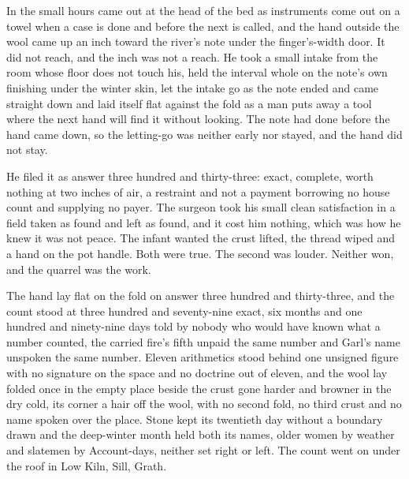 In the small hours  came out at the head of the bed as instruments come out on a towel when a case is done and before the next is called, and the hand outside the wool came up an inch toward the river's note under the finger's-width door. It did not reach, and the inch was not a reach. He took a small intake from the room whose floor does not touch his, held the interval whole on the note's own finishing under the winter skin, let the intake go as the note ended and came straight down and laid itself flat against the fold as a man puts away a tool where the next hand will find it without looking. The note had done before the hand came down, so the letting-go was neither early nor stayed, and the hand did not stay.

He filed it as answer three hundred and thirty-three: exact, complete, worth nothing at two inches of air, a restraint and not a payment borrowing no house count and supplying no payer. The surgeon took his small clean satisfaction in a field taken as found and left as found, and it cost him nothing, which was how he knew it was not peace. The infant wanted the crust lifted, the thread wiped and a hand on the pot handle. Both were true. The second was louder. Neither won, and the quarrel was the work.

The hand lay flat on the fold on answer three hundred and thirty-three, and the count stood at three hundred and seventy-nine exact, six months and one hundred and ninety-nine days told by nobody who would have known what a number counted, the carried fire's fifth unpaid the same number and Garl's name unspoken the same number. Eleven arithmetics stood behind one unsigned figure with no signature on the space and no doctrine out of eleven, and the wool lay folded once in the empty place beside the crust gone harder and browner in the dry cold, its corner a hair off the wool, with no second fold, no third crust and no name spoken over the place. Stone kept its twentieth day without a boundary drawn and the deep-winter month held both its names, older women by weather and slatemen by Account-days, neither set right or left. The count went on under the roof in Low Kiln, Sill, Grath.
